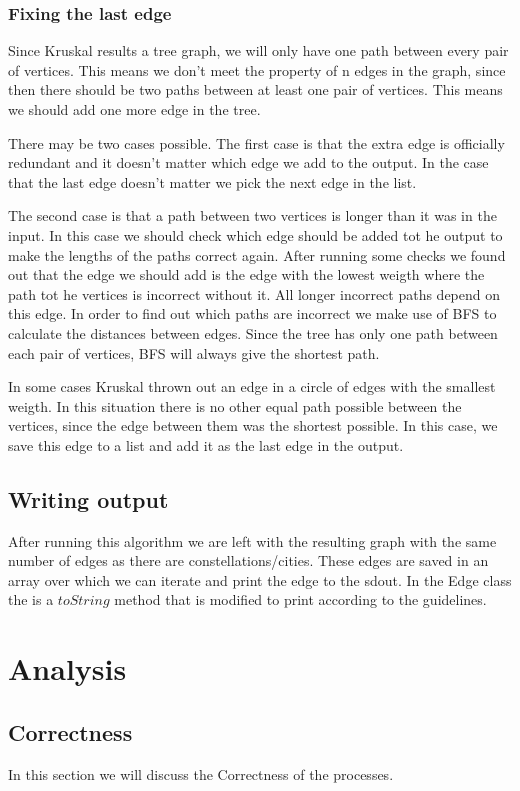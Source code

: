 \documentclass{article}
\begin{document}
\subsubsection{Fixing the last edge}
Since Kruskal results a tree graph, we will only have one path between every pair of vertices. This means we don’t meet the property of n edges in the graph, since then there should be two paths between at least one pair of vertices. This means we should add one more edge in the tree.

There may be two cases possible. The first case is that the extra edge is officially redundant and it doesn’t matter which edge we add to the output. In the case that the last edge doesn't matter we pick the next edge in the list.

The second case is that a path between two vertices is longer than it was in the input. In this case we should check which edge should be added tot he output to make the lengths of the paths correct again. After running some checks we found out that the edge we should add is the edge with the lowest weigth where the path tot he vertices is incorrect without it. All longer incorrect paths depend on this edge. In order to find out which paths are incorrect we make use of BFS to calculate the distances between edges. Since the tree has only one path between each pair of vertices, BFS will always give the shortest path.

In some cases Kruskal thrown out an edge in a circle of edges with the smallest weigth. In this situation there is no other equal path possible between the vertices, since the edge between them was the shortest possible. In this case, we save this edge to a list and add it as the last edge in the output.

\subsection{Writing output}
After running this algorithm we are left with the resulting graph with the same number of edges as there are constellations/cities. These edges are saved in an array over which we can iterate and print the edge to the sdout. In the Edge class the is a $toString$ method that is modified to print according to the guidelines.

\newpage
\section{Analysis}

\subsection{Correctness}
In this section we will discuss the Correctness of the processes.
\end{document}
